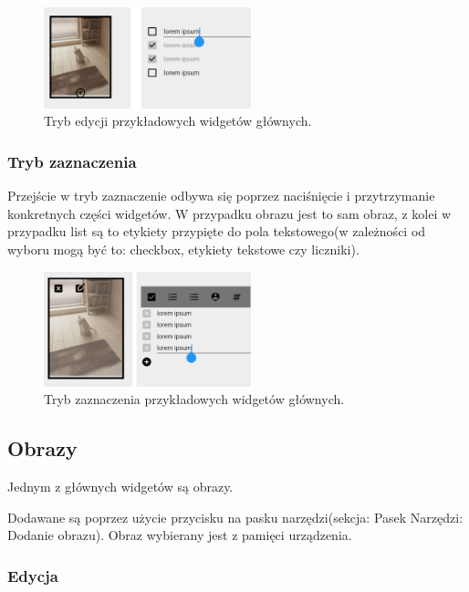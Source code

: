 \begin{figure}[ht]
    \centering
    \includegraphics[width=6cm]{images/tryb_edycji.png}
    \caption{Tryb edycji przykładowych widgetów głównych.}
    \vspace{3mm}
\end{figure}

\subsubsection{Tryb zaznaczenia}

Przejście w tryb zaznaczenie odbywa się poprzez naciśnięcie i przytrzymanie konkretnych części widgetów. W przypadku obrazu jest to sam obraz, z kolei w przypadku list są to etykiety przypięte do pola tekstowego(w zależności od wyboru mogą być to: checkbox, etykiety tekstowe czy liczniki).

\begin{figure}[ht]
    \centering
    \includegraphics[width=6cm]{images/tryb_zaznaczenia.png}
    \caption{Tryb zaznaczenia przykładowych widgetów głównych.}
    \vspace{3mm}
\end{figure}


\subsection{Obrazy}

Jednym z głównych widgetów są obrazy. 

Dodawane są poprzez użycie przycisku na pasku narzędzi(sekcja: Pasek Narzędzi: Dodanie obrazu). Obraz wybierany jest z pamięci urządzenia.

\subsubsection{Edycja}

